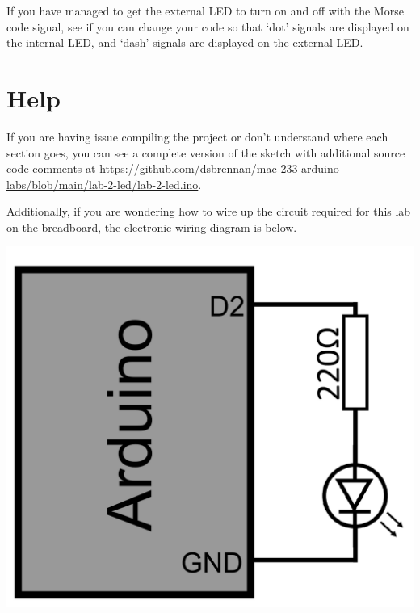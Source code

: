 \documentclass[11pt,a4paper]{article}
\begin{document}
\noindent
If you have managed to get the external LED to turn on and off with the Morse code signal, see if you can change your code so that `dot' signals are displayed on the internal LED, and `dash' signals are displayed on the external LED.

\pagebreak
\section*{Help}
If you are having issue compiling the project or don't understand where each section goes, you can see a complete version of the sketch with additional source code comments at \url{https://github.com/dsbrennan/mac-233-arduino-labs/blob/main/lab-2-led/lab-2-led.ino}.

\vspace{2em}

\begin{center}
\end{center}

\vspace{2em}

\noindent
Additionally, if you are wondering how to wire up the circuit required for this lab on the breadboard, the electronic wiring diagram is below.

\begin{center}
    \includegraphics[width=.4\textwidth]{./images/wiring-diagram.png}
\end{center}
\end{document}
